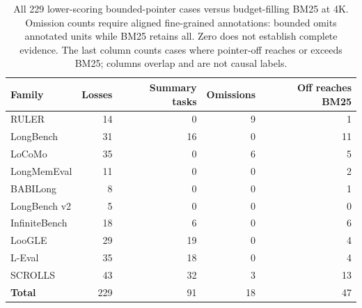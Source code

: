 \begin{table}[htbp]
\centering
\small
\setlength{\tabcolsep}{4pt}
\caption{All 229 lower-scoring bounded-pointer cases versus budget-filling BM25 at 4K. Omission counts require aligned fine-grained annotations: bounded omits annotated units while BM25 retains all. Zero does not establish complete evidence. The last column counts cases where pointer-off reaches or exceeds BM25; columns overlap and are not causal labels.}
\label{tab:loss-families}
\begin{tabular}{lrrrr}
\toprule
Family & Losses & Summary tasks & Omissions & Off reaches BM25 \\
\midrule
RULER & 14 & 0 & 9 & 1 \\
LongBench & 31 & 16 & 0 & 11 \\
LoCoMo & 35 & 0 & 6 & 5 \\
LongMemEval & 11 & 0 & 0 & 2 \\
BABILong & 8 & 0 & 0 & 1 \\
LongBench v2 & 5 & 0 & 0 & 0 \\
InfiniteBench & 18 & 6 & 0 & 6 \\
LooGLE & 29 & 19 & 0 & 4 \\
L-Eval & 35 & 18 & 0 & 4 \\
SCROLLS & 43 & 32 & 3 & 13 \\
\textbf{Total} & 229 & 91 & 18 & 47 \\
\bottomrule
\end{tabular}
\end{table}
